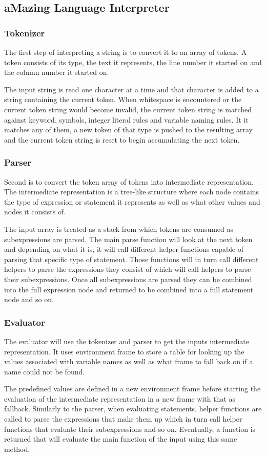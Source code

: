 \subsection{aMazing Language Interpreter}

\subsubsection{Tokenizer}

The first step of interpreting a string is to convert it to an array of tokens. A token consists of its type, the text it represents, the line number it started on and the column number it started on.

The input string is read one character at a time and that character is added to a string containing the current token. When whitespace is encountered or the current token string would become invalid, the current token string is matched against keyword, symbols, integer literal rules and variable naming rules. It it matches any of them, a new token of that type is pushed to the resulting array and the current token string is reset to begin accumulating the next token.

\subsubsection{Parser}

Second is to convert the token array of tokens into intermediate representation. The intermediate representation is a tree-like structure where each node contains the type of expression or statement it represents as well as what other values and nodes it consists of.

The input array is treated as a stack from which tokens are consumed as subexpressions are parsed. The main parse function will look at the next token and depending on what it is, it will call different helper functions capable of parsing that specific type of statement. Those functions will in turn call different helpers to parse the expressions they consist of which will call helpers to parse their subexpressions. Once all subexpressions are parsed they can be combined into the full expression node and returned to be combined into a full statement node and so on.

\subsubsection{Evaluator}

The evaluator will use the tokenizer and parser to get the inputs intermediate representation. It uses environment frame to store a table for looking up the values associated with variable names as well as what frame to fall back on if a name could not be found.

The predefined values are defined in a new environment frame before starting the evaluation of the intermediate representation in a new frame with that as fallback. Similarly to the parser, when evaluating statements, helper functions are called to parse the expressions that make them up which in turn call helper functions that evaluate their subexpressions and so on. Eventually, a function is returned that will evaluate the main function of the input using this same method.
